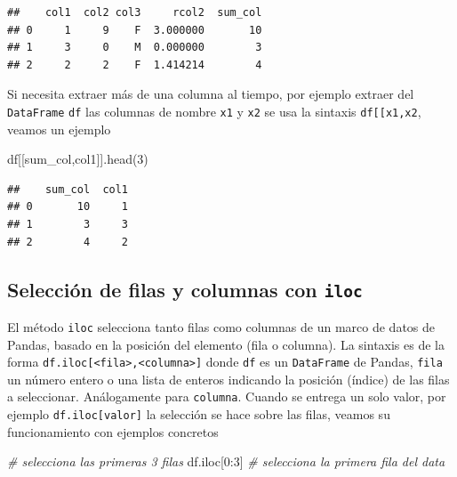 \documentclass[
]{book}
\newenvironment{Shaded}{\begin{snugshade}}{\end{snugshade}}
\newcommand{\CommentTok}[1]{\textcolor[rgb]{0.56,0.35,0.01}{\textit{#1}}}
\newcommand{\DecValTok}[1]{\textcolor[rgb]{0.00,0.00,0.81}{#1}}
\newcommand{\NormalTok}[1]{#1}
\newcommand{\StringTok}[1]{\textcolor[rgb]{0.31,0.60,0.02}{#1}}
\theoremstyle{definition}
\theoremstyle{definition}
\theoremstyle{definition}
\theoremstyle{definition}
\theoremstyle{remark}
\begin{document}
\begin{verbatim}
##    col1  col2 col3     rcol2  sum_col
## 0     1     9    F  3.000000       10
## 1     3     0    M  0.000000        3
## 2     2     2    F  1.414214        4
\end{verbatim}

Si necesita extraer más de una columna al tiempo, por ejemplo extraer del \texttt{DataFrame} \texttt{df} las columnas de nombre \texttt{x1} y \texttt{x2} se usa la sintaxis \texttt{df{[}{[}\textquotesingle{}x1\textquotesingle{},\textquotesingle{}x2\textquotesingle{}{]}{]}}, veamos un ejemplo

\begin{Shaded}
\begin{Highlighting}[]
\NormalTok{df[[}\StringTok{\textquotesingle{}sum\_col\textquotesingle{}}\NormalTok{,}\StringTok{\textquotesingle{}col1\textquotesingle{}}\NormalTok{]].head(}\DecValTok{3}\NormalTok{) }
\end{Highlighting}
\end{Shaded}

\begin{verbatim}
##    sum_col  col1
## 0       10     1
## 1        3     3
## 2        4     2
\end{verbatim}

\hypertarget{selecciuxf3n-de-filas-y-columnas-con-iloc}{%
\subsection{\texorpdfstring{Selección de filas y columnas con \texttt{iloc}}{Selección de filas y columnas con iloc}}\label{selecciuxf3n-de-filas-y-columnas-con-iloc}}

El método \texttt{iloc} selecciona tanto filas como columnas de un marco de datos de Pandas, basado en la posición del elemento (fila o columna). La sintaxis es de la forma \texttt{df.iloc{[}\textless{}fila\textgreater{},\textless{}columna\textgreater{}{]}} donde \texttt{df} es un \texttt{DataFrame} de Pandas, \texttt{fila} un número entero o una lista de enteros indicando la posición (índice) de las filas a seleccionar. Análogamente para \texttt{columna}. Cuando se entrega un solo valor, por ejemplo \texttt{df.iloc{[}valor{]}} la selección se hace sobre las filas, veamos su funcionamiento con ejemplos concretos

\begin{Shaded}
\begin{Highlighting}[]
\CommentTok{\# selecciona las primeras 3 filas }
\NormalTok{df.iloc[}\DecValTok{0}\NormalTok{:}\DecValTok{3}\NormalTok{] }
\CommentTok{\# selecciona la primera fila del data}
\end{Highlighting}
\end{Shaded}
\end{document}
